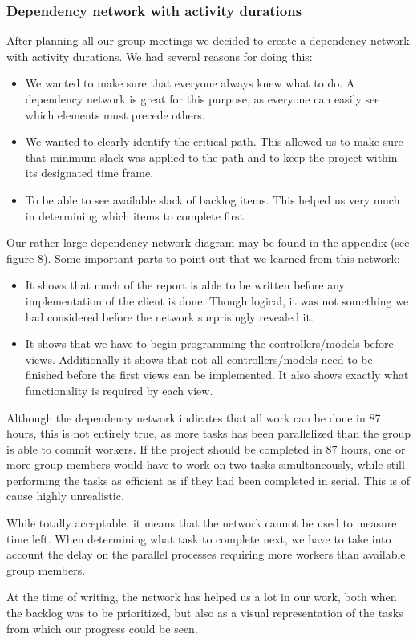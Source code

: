 \subsubsection{Dependency network with activity durations}
After planning all our group meetings we decided to create a dependency network with activity durations. We had several reasons for doing this:

\begin{itemize}
	\item We wanted to make sure that everyone always knew what to do. A dependency network is great for this purpose, as everyone can easily see which elements must precede others.
	\item We wanted to clearly identify the critical path. This allowed us to make sure that minimum slack was applied to the path and to keep the project within its designated time frame.
	\item To be able to see available slack of backlog items. This helped us very much in determining which items to complete first.
\end{itemize}

Our rather large dependency network diagram may be found in the appendix (see figure 8).
Some important parts to point out that we learned from this network:

\begin{itemize}
	\item It shows that much of the report is able to be written before any implementation of the client is done. Though logical, it was not something we had considered before the network surprisingly revealed it.
	
	\item It shows that we have to begin programming the controllers/models before views. Additionally it shows that not all controllers/models need to be finished before the first views can be implemented. It also shows exactly what functionality is required by each view.
\end{itemize}

Although the dependency network indicates that all work can be done in 87 hours, this is not entirely true, as more tasks has been parallelized than the group is able to commit workers. If the project should be completed in 87 hours, one or more group members would have to work on two tasks simultaneously, while still performing the tasks as efficient as if they had been completed in serial. This is of cause highly unrealistic.

While totally acceptable, it means that the network cannot be used to measure time left. When determining what task to complete next, we have to take into account the delay on the parallel processes requiring more workers than available group members.

At the time of writing, the network has helped us a lot in our work, both when the backlog was to be prioritized, but also as a visual representation of the tasks from which our progress could be seen.